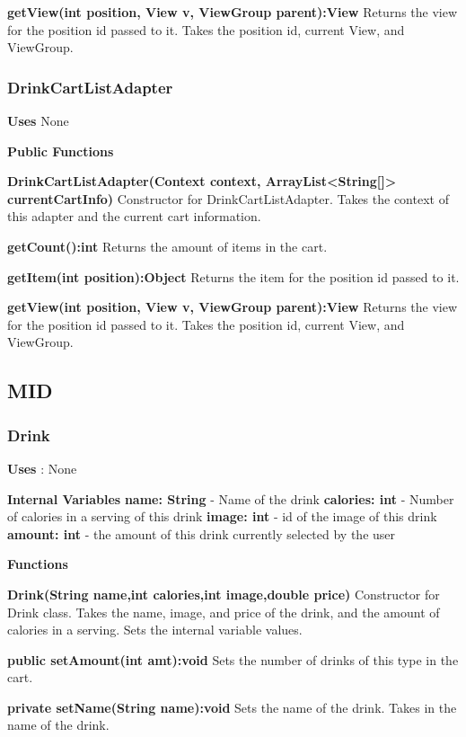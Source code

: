 \documentclass [10pt]{article}
\begin{document}
\textbf{getView(int position, View v, ViewGroup parent):View}
Returns the view for the position id passed to it. Takes the position id, current View, and ViewGroup.

\subsubsection{DrinkCartListAdapter}
\textbf{Uses} None

\textbf{Public Functions}

\textbf{DrinkCartListAdapter(Context context, ArrayList<String[]> currentCartInfo)}
Constructor for DrinkCartListAdapter. Takes the context of this adapter and the current cart information.

\textbf{getCount():int}
Returns the amount of items in the cart.

\textbf{getItem(int position):Object}
Returns the item for the position id passed to it.

\textbf{getView(int position, View v, ViewGroup parent):View}
Returns the view for the position id passed to it. Takes the position id, current View, and ViewGroup.

\subsection{MID}

\subsubsection{Drink}

\textbf{Uses} : None

\textbf{Internal Variables}
\textbf{name: String} - Name of the drink
\textbf{calories: int} - Number of calories in a serving of this drink
\textbf{image: int} - id of the image of this drink
\textbf{amount: int} - the amount of this drink currently selected by the user

\textbf{Functions}

\textbf{Drink(String name,int calories,int image,double price)}
Constructor for Drink class. Takes the name, image, and price of the drink, and the amount of calories in a serving. Sets the internal variable values.

\textbf{public setAmount(int amt):void}
Sets the number of drinks of this type in the cart.

\textbf{private setName(String name):void}
Sets the name of the drink. Takes in the name of the drink.
\end{document}
